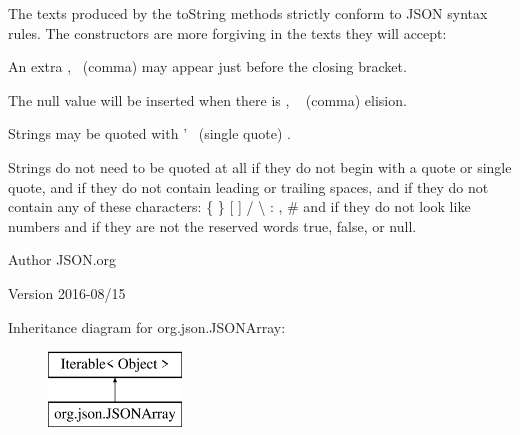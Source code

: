 The texts produced by the {\ttfamily to\-String} methods strictly conform to J\-S\-O\-N syntax rules. The constructors are more forgiving in the texts they will accept\-: 
\begin{DoxyItemize}
\item An extra {\ttfamily ,}~
\footnotesize (comma)
\normalsize  may appear just before the closing bracket. 
\item The {\ttfamily null} value will be inserted when there is {\ttfamily ,} ~
\footnotesize (comma)
\normalsize  elision. 
\item Strings may be quoted with {\ttfamily '}~
\footnotesize (single quote)
\normalsize . 
\item Strings do not need to be quoted at all if they do not begin with a quote or single quote, and if they do not contain leading or trailing spaces, and if they do not contain any of these characters\-: {\ttfamily \{ \} \mbox{[} \mbox{]} / \textbackslash{} \-: , \#} and if they do not look like numbers and if they are not the reserved words {\ttfamily true}, {\ttfamily false}, or {\ttfamily null}. 
\end{DoxyItemize}

\begin{DoxyAuthor}{Author}
J\-S\-O\-N.\-org 
\end{DoxyAuthor}
\begin{DoxyVersion}{Version}
2016-\/08/15 
\end{DoxyVersion}
Inheritance diagram for org.\-json.\-J\-S\-O\-N\-Array\-:\begin{figure}[H]
\begin{center}
\leavevmode
\includegraphics[height=2.000000cm]{classorg_1_1json_1_1JSONArray}
\end{center}
\end{figure}
